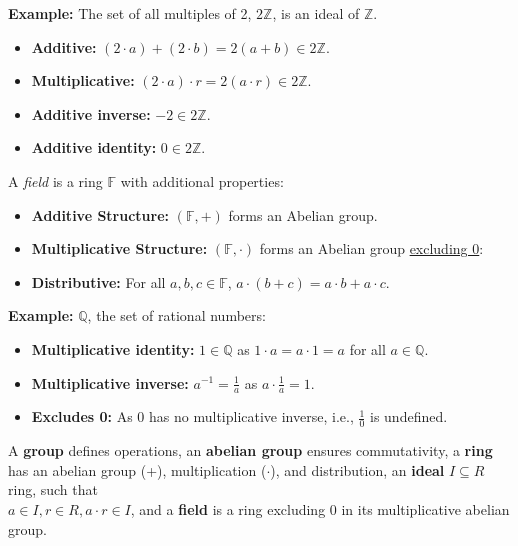 \noindent
\textbf{Example:} The set of all multiples of 2, $2\mathbb{Z}$, is an ideal of $\mathbb{Z}$.
\begin {itemize}
\item \textbf{Additive:} $(2\cdot a)+(2\cdot b)=2(a+b)\in 2\mathbb{Z}$.
\item \textbf{Multiplicative:} $(2\cdot a)\cdot r=2(a\cdot r)\in 2\mathbb{Z}$.
\item \textbf{Additive inverse:} $-2\in 2\mathbb{Z}$.
\item \textbf{Additive identity:} $0\in 2\mathbb{Z}$.
\end{itemize}


\begin{Def}[Field]

    A \textit{field} is a ring $\mathbb{F}$ with additional properties:
    \begin{itemize}
        \item \textbf{Additive Structure:} $(\mathbb{F},+)$ forms an Abelian group.
        \item \textbf{Multiplicative Structure:} $(\mathbb{F},\cdot)$ forms an Abelian group \underline{excluding 0}:
        \item \textbf{Distributive:} For all $a,b,c\in\mathbb{F}$, $a\cdot(b+c)=a\cdot b+a\cdot c$.
    \end{itemize}
\end{Def}

\noindent
\textbf{Example:} $\mathbb{Q}$, the set of rational numbers:
\begin{itemize}
    \item \textbf{Multiplicative identity:} $1\in\mathbb{Q}$ as $1\cdot a=a\cdot 1=a$ for all $a\in\mathbb{Q}$.
    \item \textbf{Multiplicative inverse:} $a^{-1}=\frac{1}{a}$ as $a\cdot\frac{1}{a}=1$.
    \item \textbf{Excludes 0:} As $0$ has no multiplicative inverse, i.e., $\frac{1}{0}$ is undefined.
\end{itemize}
\begin{Tip}
    A \textbf{group} defines operations, an \textbf{abelian group} ensures
    commutativity, a \textbf{ring} has an abelian group (+), multiplication ($\cdot$), and distribution,
    an \textbf{ideal} $I\subseteq  R$ ring, such that\\ $a\in I,r\in R, a\cdot r\in I$, and a \textbf{field} is a ring
    excluding 0 in its multiplicative abelian group.
\end{Tip}


